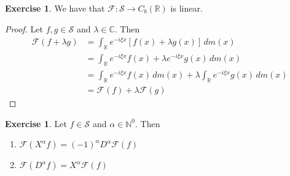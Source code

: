 \documentclass[12pt]{amsart}
\theoremstyle{definition}
\newtheorem{ex}[definition]{Exercise}
\newcommand{\al}{\alpha}
\newcommand{\lam}{\lambda}
\newcommand{\C}{\mathbb{C}}
\newcommand{\N}{\mathbb{N}}
\newcommand{\R}{\mathbb{R}}
\newcommand{\MF}{\mathcal{F}}
\newcommand{\MS}{\mathcal{S}}
\newcommand{\dm}{\, d m}
\begin{document}
	\begin{ex}
		We have that $\MF: \MS \rightarrow C_b(\R)$ is linear. 
	\end{ex}
	
	\begin{proof}
		Let $f,g \in \MS$ and $\lam \in \C$. Then 
		\begin{align*}
			\MF(f + \lam g) 
			& = \int_{\R} e^{-i \xi x} [f(x) + \lam g(x)] \dm(x) \\
			& = \int_{\R} e^{-i \xi x} f(x) + \lam e^{-i \xi x} g(x) \dm(x) \\
			& = \int_{\R} e^{-i \xi x} f(x) \dm(x) + \lam \int_{\R} e^{-i \xi x} g(x) \dm(x) \\
			&= \MF(f) + \lam \MF(g)
		\end{align*}
	\end{proof}

	\begin{ex}
		Let $f \in \MS$ and $\al \in \N^0$. Then 
		\begin{enumerate}
			\item $\MF(X^{\al}f) = (-1)^{\al}D^{\al} \MF(f)$ 
			\item $\MF(D^{\al}f) = X^{\al} \MF(f)$
		\end{enumerate}
	\end{ex}
	
\end{document}

